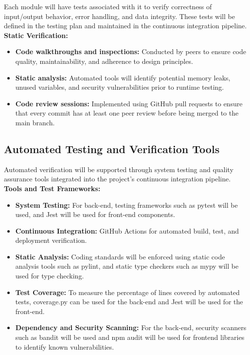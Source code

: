 \documentclass[12pt, titlepage]{article}
\begin{document}
Each module will have tests associated with it to verify correctness of input/output behavior, error handling, and data integrity. These tests will be defined in the testing plan and maintained in the continuous integration pipeline.  
\newline
\newline
\textbf{Static Verification:}
\begin{itemize}
  \item \textbf{Code walkthroughs and inspections:} Conducted by peers to ensure code quality, maintainability, and adherence to design principles.
  \item \textbf{Static analysis:} Automated tools will identify potential memory leaks, unused variables, and security vulnerabilities prior to runtime testing.
  \item \textbf{Code review sessions:} Implemented using GitHub pull requests to ensure that every commit has at least one peer review before being merged to the main branch.
\end{itemize}

\subsection{Automated Testing and Verification Tools}

Automated verification will be supported through system testing and quality assurance tools integrated into the project's continuous integration pipeline.  
\newline
\newline
\textbf{Tools and Test Frameworks:}
\begin{itemize}
  \item \textbf{System Testing:} For back-end, testing frameworks such as pytest will be used, and Jest will be used for front-end components.
  \item \textbf{Continuous Integration:} GitHub Actions for automated build, test, and deployment verification.
  \item \textbf{Static Analysis:} Coding standards will be enforced using static code analysis tools such as pylint, and static type checkers such as mypy will be used for type checking.
  \item \textbf{Test Coverage:} To measure the percentage of lines covered by automated tests, coverage.py can be used for the back-end and Jest will be used for the front-end.
  \item \textbf{Dependency and Security Scanning:} For the back-end, security scanners such as bandit will be used and npm audit will be used for frontend libraries to identify known vulnerabilities.
\end{itemize}
\end{document}
